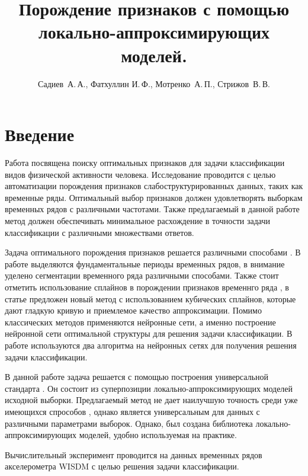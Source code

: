 \documentclass[12pt,twoside]{article}
\title
    [Порождение признаков с помощью локально-аппроксимирующих моделей.]
    {Порождение признаков с помощью локально-аппроксимирующих моделей.}
\author
    {Садиев~А.\,А., Фатхуллин И.\,Ф., Мотренко~А.\,П., Стрижов~В.\,В.} %
    [Садиев~А.\,А.$^1$,Фатхуллин И.\,Ф.$^1$, Мотренко~А.\,П.$^1$, Стрижов~В.\,В.$^1$] %
\begin{document}
\maketitle
\section{Введение}
Работа посвящена поиску оптимальных признаков для задачи классификации видов физической активности человека. Исследование проводится с целью автоматизации порождения признаков слабоструктурированных данных, таких как временные ряды. Оптимальный выбор признаков должен удовлетворять выборкам временных рядов с различными частотами. Также предлагаемый в данной работе метод должен обеспечивать минимальное расхождение в точности задачи классификации с различными множествами ответов.

Задача оптимального порождения признаков решается различными способами \cite{MotrenkoS16,KarStr16, KuzIv15,  AnPenStr18, IsZhar18, ZaPoStr16 }. В работе \cite{MotrenkoS16} выделяются фундаментальные периоды временных рядов, в \cite{KarStr16, KuzIv15} внимание уделено сегментации временного ряда различными способами. Также стоит отметить использование сплайнов в порождении признаков временнго ряда \cite{AnPenStr18}, в статье \cite{IsZhar18} предложен новый метод с использованием кубических сплайнов, которые дают гладкую кривую и приемлемое качество аппроксимации. Помимо классических методов применяются нейронные сети, а именно построение нейронной сети оптимальной структуры для решения задачи классификации. В работе \cite{ZaPoStr16} используются два алгоритма на нейронных сетях для получения решения задачи классификации.

В данной работе задача решается с помощью построения  универсальной стандарта . Он состоит из суперпозиции  локально-аппроксимирующих моделей исходной выборки. Предлагаемый метод не дает наилучшую точность среди уже имеющихся спрособов , однако является универсальным для данных с различными параметрами выборок. Однако, был создана библиотека локально-аппроксимирующих моделей, удобно используемая на практике.

Вычислительный эксперимент проводится на данных временных рядов акселерометра WISDM с целью решения задачи классификации.
\end{document}
